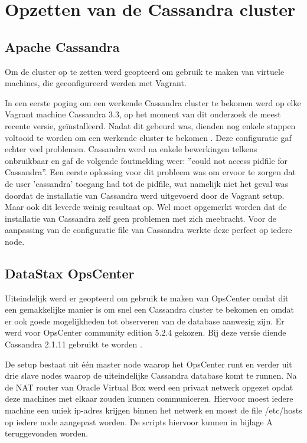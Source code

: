 \chapter{Opzetten van de Cassandra cluster}
\label{ch:cassandra_cluster}

\section{Apache Cassandra}
Om de cluster op te zetten werd geopteerd om gebruik te maken van virtuele machines, die geconfigureerd werden met Vagrant.

In een eerste poging om een werkende Cassandra cluster te bekomen werd op elke Vagrant machine Cassandra 3.3, op het moment van dit onderzoek de meest recente versie, geïnstalleerd.
Nadat dit gebeurd was, dienden nog enkele stappen voltooid te worden om een werkende cluster te bekomen \citep{DataStax2016}.
Deze configuratie gaf echter veel problemen.
Cassandra werd na enkele bewerkingen telkens onbruikbaar en gaf de volgende foutmelding weer: ''could not access pidfile for Cassandra''.
Een eerste oplossing voor dit probleem was om ervoor te zorgen dat de user 'cassandra' toegang had tot de pidfile, wat namelijk niet het geval was doordat de installatie van Cassandra werd uitgevoerd door de Vagrant setup.
Maar ook dit leverde weinig resultaat op.
Wel moet opgemerkt worden dat de installatie van Cassandra zelf geen problemen met zich meebracht.
Voor de aanpassing van de configuratie file van Cassandra werkte deze perfect op iedere node.

\section{DataStax OpsCenter}

Uiteindelijk werd er geopteerd om gebruik te maken van OpsCenter omdat dit een gemakkelijke manier is om snel een Cassandra cluster te bekomen en omdat er ook goede mogelijkheden tot observeren van de database aanwezig zijn.
Er werd voor OpsCenter community edition 5.2.4 gekozen.
Bij deze versie diende Cassandra 2.1.11 gebruikt te worden \citep{Cantoni2016}.

De setup bestaat uit één master node waarop het OpsCenter runt en verder uit drie slave nodes waarop de uiteindelijke Cassandra database komt te runnen.
Na de NAT router van Oracle Virtual Box werd een privaat netwerk opgezet opdat deze machines met elkaar zouden kunnen communiceren.
Hiervoor moest iedere machine een uniek ip-adres krijgen binnen het netwerk en moest de file /etc/hosts op iedere node aangepast worden.
De scripts hiervoor kunnen in bijlage A teruggevonden worden.

